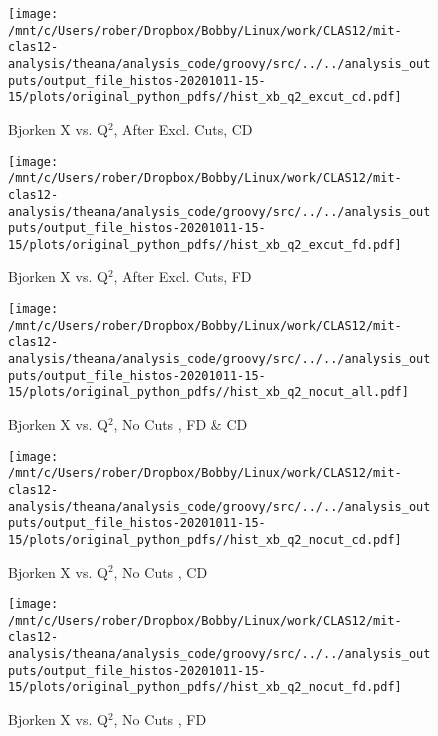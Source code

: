 \documentclass{article}
\begin{document}
\begin{landscape}
    \begin{figure}[h]
        \centering

        \texttt{[image: /mnt/c/Users/rober/Dropbox/Bobby/Linux/work/CLAS12/mit-clas12-analysis/theana/analysis\_code/groovy/src/../../analysis\_outputs/output\_file\_histos-20201011-15-15/plots/original\_python\_pdfs//hist\_xb\_q2\_excut\_cd.pdf]}
        \captionsetup{textformat=empty,labelformat=blank}
        \caption{Bjorken X vs. Q$^{2}$, After Excl. Cuts, CD}
    \end{figure}
    \clearpage
    
    \begin{figure}[h]
        \centering

        \texttt{[image: /mnt/c/Users/rober/Dropbox/Bobby/Linux/work/CLAS12/mit-clas12-analysis/theana/analysis\_code/groovy/src/../../analysis\_outputs/output\_file\_histos-20201011-15-15/plots/original\_python\_pdfs//hist\_xb\_q2\_excut\_fd.pdf]}
        \captionsetup{textformat=empty,labelformat=blank}
        \caption{Bjorken X vs. Q$^{2}$, After Excl. Cuts, FD}
    \end{figure}
    \clearpage
    
    \begin{figure}[h]
        \centering

        \texttt{[image: /mnt/c/Users/rober/Dropbox/Bobby/Linux/work/CLAS12/mit-clas12-analysis/theana/analysis\_code/groovy/src/../../analysis\_outputs/output\_file\_histos-20201011-15-15/plots/original\_python\_pdfs//hist\_xb\_q2\_nocut\_all.pdf]}
        \captionsetup{textformat=empty,labelformat=blank}
        \caption{Bjorken X vs. Q$^{2}$, No Cuts , FD \& CD}
    \end{figure}
    \clearpage
    
    \begin{figure}[h]
        \centering

        \texttt{[image: /mnt/c/Users/rober/Dropbox/Bobby/Linux/work/CLAS12/mit-clas12-analysis/theana/analysis\_code/groovy/src/../../analysis\_outputs/output\_file\_histos-20201011-15-15/plots/original\_python\_pdfs//hist\_xb\_q2\_nocut\_cd.pdf]}
        \captionsetup{textformat=empty,labelformat=blank}
        \caption{Bjorken X vs. Q$^{2}$, No Cuts , CD}
    \end{figure}
    \clearpage
    
    \begin{figure}[h]
        \centering

        \texttt{[image: /mnt/c/Users/rober/Dropbox/Bobby/Linux/work/CLAS12/mit-clas12-analysis/theana/analysis\_code/groovy/src/../../analysis\_outputs/output\_file\_histos-20201011-15-15/plots/original\_python\_pdfs//hist\_xb\_q2\_nocut\_fd.pdf]}
        \captionsetup{textformat=empty,labelformat=blank}
        \caption{Bjorken X vs. Q$^{2}$, No Cuts , FD}
    \end{figure}
    \clearpage
    

\end{landscape}
\end{document}
